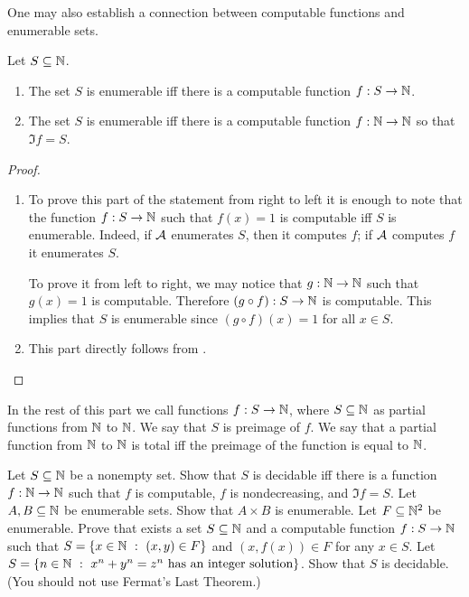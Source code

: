 One may also establish a connection between computable functions and
enumerable sets.
\begin{theorem}
\label{theorem:enumerable-via-computable-funcitons}
  Let $S \subseteq {\mathbb{N}}$.
  \begin{enumerate}
    \item The set $S$ is enumerable iff there is a computable function
      $f : S \to {\mathbb{N}}$.
    \item The set $S$ is enumerable iff there is a computable function
      $f : {\mathbb{N}} \to {\mathbb{N}}$ so that $\Im{f} = S$.
  \end{enumerate}
\end{theorem}
\begin{proof}
  \begin{enumerate}
    \item To prove this part of the statement from right to left
        it is enough to note that
        the function $f : S \to {\mathbb{N}}$ such that $f(x) = 1$ is computable iff
        $S$ is enumerable. Indeed, if $\mathcal{A}$ enumerates $S$, then
        it computes $f$; if $\mathcal{A}$ computes $f$ it enumerates $S$.

        To prove it from left to right, we may notice that $g : {\mathbb{N}} \to {\mathbb{N}}$
        such that $g(x) = 1$ is computable.
        Therefore $(g \circ f) : S \to {\mathbb{N}}$ is
        computable. This implies that $S$ is enumerable since
        $(g \circ f)(x) = 1$ for all $x \in S$.
    \item This part directly follows from
        .
  \end{enumerate}
\end{proof}

In the rest of this part we call functions $f : S \to {\mathbb{N}}$,
where $S \subseteq {\mathbb{N}}$ as partial functions from ${\mathbb{N}}$ to ${\mathbb{N}}$. We say
that $S$ is preimage of $f$. We say that a partial function from
${\mathbb{N}}$ to ${\mathbb{N}}$ is total iff the preimage of the function is equal to ${\mathbb{N}}$.

\begin{chapterendexercises}
  \exercise[recommended] Let $S \subseteq {\mathbb{N}}$ be a nonempty set.
    Show that $S$ is decidable iff there is a function $f : {\mathbb{N}} \to {\mathbb{N}}$ such
    that $f$ is computable, $f$ is nondecreasing, and $\Im{f} = S$.
  \exercise Let $A, B \subseteq {\mathbb{N}}$ be enumerable sets. Show that
    $A \times B$ is enumerable.
  \exercise Let $F \subseteq {\mathbb{N}}^2$ be enumerable. Prove that exists a
    set $S \subseteq {\mathbb{N}}$ and a computable function $f: S \to {\mathbb{N}}$ such that
    $S = \set[(x, y) \in F]{x \in \N}$ and $(x, f(x)) \in F$ for any $x \in S$.
  \exercise
    Let $S =
      \set[
        x^n + y^n = z^n \text{ has an integer solution}
      ]{n \in \N}$. Show that $S$ is decidable.
      (You should not use Fermat's Last Theorem.)
\end{chapterendexercises}
